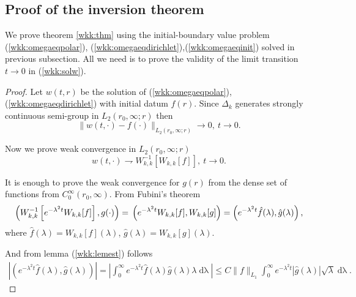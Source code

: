 \documentclass[manuscript, printscheme]{paper}
\newcommand{\ds}{\operatorname{ds}}
\newcommand{\dlambda}{\operatorname{d\lambda}}
\begin{document}
\subsection{Proof of the inversion theorem} \label{wkk:proof}

We prove theorem \ref{wkk:thm} using the initial-boundary value problem (\ref{wkk:omegaeqpolar}), (\ref{wkk:omegaeqdirichlet}),(\ref{wkk:omegaeqinit}) solved in previous subsection. All we need is to prove the validity of the limit transition $t\to 0$ in (\ref{wkk:solw}).

\begin{proof}
Let $w(t,r)$ be the solution of (\ref{wkk:omegaeqpolar}), (\ref{wkk:omegaeqdirichlet}) with initial datum $f(r)$. Since $\Delta_k$ generates strongly continuous semi-group in $L_2(r_0,\infty; r)$ then
$$
\|w(t,\cdot) - f(\cdot)\|_{L_2(r_0,\infty; r)} \to 0,~t\to 0.
$$ 

Now we prove weak convergence in $L_2(r_0,\infty; r)$
$$
w(t,\cdot) \rightharpoondown W^{-1}_{k,k}\left [W_{k,k} [f] \right ]  ,~t\to 0.
$$

It is enough to prove the weak convergence for $g(r)$ from the dense set of functions from $C_0^\infty(r_0,\infty)$. From Fubini’s theorem
$$
\left (W^{-1}_{k,k}\left [ e^{-\lambda^2 t} W_{k,k}[f] \right ], g(\cdot) \right ) = \\
\left ( e^{-\lambda^2 t}W_{k,k}[f], W_{k,k}[g] \right )=
\left ( e^{-\lambda^2 t}\hat f(\lambda), \hat g (\lambda) \right ),
$$
where $\hat f(\lambda) = W_{k,k}[f](\lambda)$, 
$\hat g(\lambda) = W_{k,k}[g] (\lambda)$. 


And from lemma (\ref{wkk:lemest}) follows
\begin{align} \label{wkk:scalarfg}
\left | \left (e^{-\lambda^2 t} \hat f(\lambda), \hat g (\lambda) \right ) \right | = \left | \int_0^\infty e^{-\lambda^2 t} \hat f(\lambda) \hat g (\lambda) \lambda \dlambda \right |\leq C \|f\|_{L_1}
\int_0^\infty e^{-\lambda^2 t} |\hat g (\lambda)| \sqrt \lambda \dlambda.
\end{align}



\end{proof}
\end{document}
